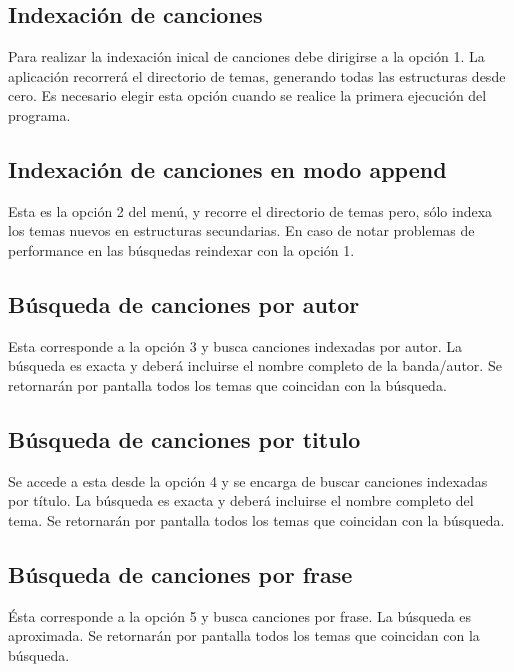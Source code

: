 \documentclass{article}
\begin{document}
\subsection{Indexación de canciones}

	Para realizar la indexación inical de canciones debe dirigirse a la opción 1. La aplicación recorrerá el directorio de temas, generando todas las estructuras desde cero. Es necesario elegir esta opción cuando se realice la primera ejecución del programa.
\bigskip



\subsection{Indexación de canciones en modo append}

	Esta es la opción 2 del menú, y recorre el directorio de temas pero, sólo indexa los temas nuevos en estructuras secundarias. En caso de notar problemas de performance en las búsquedas reindexar con la opción 1.
\bigskip



\subsection{Búsqueda de canciones por autor}

	Esta corresponde a la opción 3 y busca canciones indexadas por autor. La búsqueda es exacta y deberá incluirse el nombre completo de la banda/autor.  Se retornarán por pantalla todos los temas que coincidan con la búsqueda.
\bigskip



\subsection{Búsqueda de canciones por titulo}

	Se accede a esta desde la opción 4 y se encarga de buscar canciones indexadas por título. La búsqueda es exacta y deberá incluirse el nombre completo del tema.  Se retornarán por pantalla todos los temas que coincidan con la búsqueda.
\bigskip



\subsection{Búsqueda de canciones por frase}

	Ésta corresponde a la opción 5 y busca canciones por frase. La búsqueda es aproximada.  Se retornarán por pantalla todos los temas que coincidan con la búsqueda.
\bigskip
\end{document}
